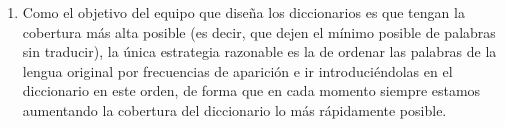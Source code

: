 \begin{enumerate}
\item Como el objetivo del equipo que diseña los diccionarios es que tengan la cobertura más alta posible (es decir, que dejen el mínimo posible de palabras sin traducir), la única estrategia razonable es la de ordenar las palabras de la lengua original por frecuencias de aparición e ir introduciéndolas en el diccionario en este orden, de forma que en cada momento siempre estamos aumentando la cobertura del diccionario lo más rápidamente posible. 


\end{enumerate}
